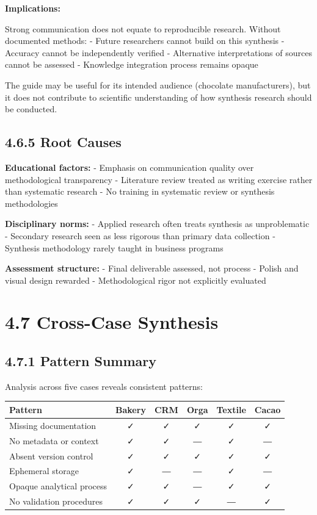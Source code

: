 \documentclass[
  oneside,
  open=any]{scrbook}
\begin{document}
\textbf{Implications:}

Strong communication does not equate to reproducible research. Without
documented methods: - Future researchers cannot build on this synthesis
- Accuracy cannot be independently verified - Alternative
interpretations of sources cannot be assessed - Knowledge integration
process remains opaque

The guide may be useful for its intended audience (chocolate
manufacturers), but it does not contribute to scientific understanding
of how synthesis research should be conducted.

\subsection{4.6.5 Root Causes}\label{root-causes-4}

\textbf{Educational factors:} - Emphasis on communication quality over
methodological transparency - Literature review treated as writing
exercise rather than systematic research - No training in systematic
review or synthesis methodologies

\textbf{Disciplinary norms:} - Applied research often treats synthesis
as unproblematic - Secondary research seen as less rigorous than primary
data collection - Synthesis methodology rarely taught in business
programs

\textbf{Assessment structure:} - Final deliverable assessed, not process
- Polish and visual design rewarded - Methodological rigor not
explicitly evaluated

\section{4.7 Cross-Case Synthesis}\label{cross-case-synthesis}

\subsection{4.7.1 Pattern Summary}\label{pattern-summary}

Analysis across five cases reveals consistent patterns:

\begin{longtable}[]{@{}lccccc@{}}
\toprule\noalign{}
Pattern & Bakery & CRM & Orga & Textile & Cacao \\
\midrule\noalign{}
\endhead
\bottomrule\noalign{}
\endlastfoot
Missing documentation & ✓ & ✓ & ✓ & ✓ & ✓ \\
No metadata or context & ✓ & ✓ & ― & ✓ & ― \\
Absent version control & ✓ & ✓ & ✓ & ✓ & ✓ \\
Ephemeral storage & ✓ & ― & ― & ✓ & ― \\
Opaque analytical process & ✓ & ✓ & ― & ✓ & ✓ \\
No validation procedures & ✓ & ✓ & ✓ & ― & ✓ \\
\end{longtable}
\end{document}
